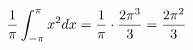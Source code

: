 \documentclass[preview]{standalone}
\begin{document}
\begin{align*}
\special{dvisvgm:raw <g id='unique000'>}\dfrac{1}{\pi}\displaystyle\int_{-\pi}^{\pi}x^2dx=\dfrac{1}{\pi}\cdot\dfrac{2\pi^3}{3}=\dfrac{2\pi^2}{3}\special{dvisvgm:raw </g>}
\end{align*}
\end{document}
